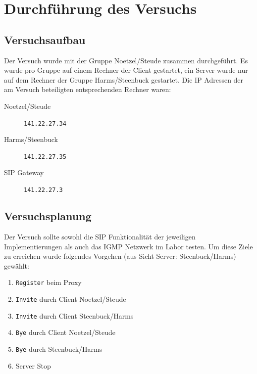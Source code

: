 \documentclass[10pt]{scrartcl}
\author{André Harms, Oliver Steenbuck}
\title{\titletext}
\date{04.01.2012}
\begin{document}
\maketitle

\setcounter{tocdepth}{3}
\tableofcontents

	\listoffigures   

\section{Durchführung des Versuchs}

\subsection{Versuchsaufbau}\label{subsec:versuchsaufbau}
Der Versuch wurde mit der Gruppe Noetzel/Steude zusammen durchgeführt.
Es wurde pro Gruppe auf einem Rechner der Client gestartet, ein Server wurde nur auf dem Rechner der Gruppe Harms/Steenbuck gestartet. Die IP Adressen der am Versuch beteiligten entsprechenden Rechner waren:
\begin{description}
	\item[Noetzel/Steude] \verb!141.22.27.34!
	\item[Harms/Steenbuck] \verb!141.22.27.35!
	\item[SIP Gateway] \verb!141.22.27.3!
\end{description}

\subsection{Versuchsplanung} \label{subsec:versuchplanung}
Der Versuch sollte sowohl die SIP Funktionalität der jeweiligen Implementierungen als auch das IGMP Netzwerk im Labor testen. Um diese Ziele zu erreichen wurde folgendes Vorgehen (aus Sicht Server: Steenbuck/Harms) gewählt:

\begin{enumerate}
	\item \verb!Register! beim Proxy
	\item \verb!Invite! durch Client Noetzel/Steude
	\item \verb!Invite! durch Client Steenbuck/Harms
	\item \verb!Bye! durch Client Noetzel/Steude
	\item \verb!Bye! durch Steenbuck/Harms
	\item Server Stop
\end{enumerate}
\end{document}
